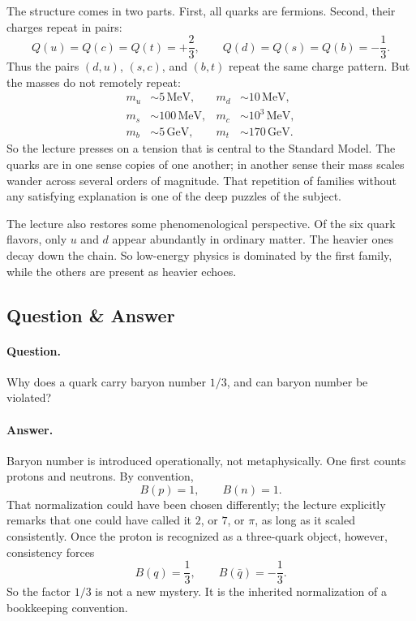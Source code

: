 The structure comes in two parts. First, all quarks are fermions. Second, their charges repeat in pairs:
\begin{equation}
Q(u)=Q(c)=Q(t)=+\frac23,
\qquad
Q(d)=Q(s)=Q(b)=-\frac13.
\end{equation}
Thus the pairs \((d,u)\), \((s,c)\), and \((b,t)\) repeat the same charge pattern. But the masses do not remotely repeat:
\begin{align}
m_u &\sim 5\,\mathrm{MeV},
&
m_d &\sim 10\,\mathrm{MeV},
\\
m_s &\sim 100\,\mathrm{MeV},
&
m_c &\sim 10^3\,\mathrm{MeV},
\\
m_b &\sim 5\,\mathrm{GeV},
&
m_t &\sim 170\,\mathrm{GeV}.
\end{align}
So the lecture presses on a tension that is central to the Standard Model. The quarks are in one sense copies of one another; in another sense their mass scales wander across several orders of magnitude. That repetition of families without any satisfying explanation is one of the deep puzzles of the subject.

The lecture also restores some phenomenological perspective. Of the six quark flavors, only \(u\) and \(d\) appear abundantly in ordinary matter. The heavier ones decay down the chain. So low-energy physics is dominated by the first family, while the others are present as heavier echoes.

\subsection{Question \& Answer}

\paragraph{Question.} Why does a quark carry baryon number \(1/3\), and can baryon number be violated?

\paragraph{Answer.} Baryon number is introduced operationally, not metaphysically. One first counts protons and neutrons. By convention,
\begin{equation}
B(p)=1,\qquad B(n)=1.
\end{equation}
That normalization could have been chosen differently; the lecture explicitly remarks that one could have called it \(2\), or \(7\), or \(\pi\), as long as it scaled consistently. Once the proton is recognized as a three-quark object, however, consistency forces
\begin{equation}
B(q)=\frac13,
\qquad
B(\bar q)=-\frac13.
\end{equation}
So the factor \(1/3\) is not a new mystery. It is the inherited normalization of a bookkeeping convention.

